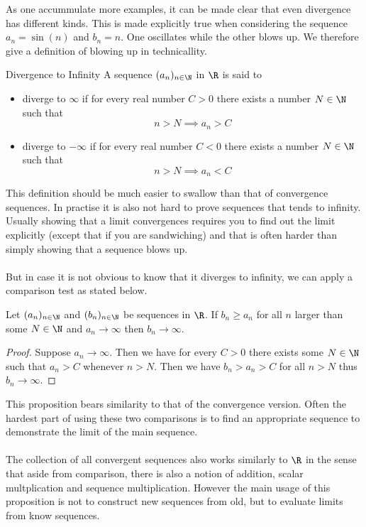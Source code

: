 As one accummulate more examples, it can be made clear that even divergence has different kinds. This is made explicitly true when considering the sequence $a_n=\sin(n)$ and $b_n=n$. One oscillates while the other blows up. We therefore give a definition of blowing up in technicallity. 

\begin{defn}{Divergence to Infinity}{} A sequence $(a_n)_{n\in\N}$ in $\R$ is said to 
\begin{itemize}
\item diverge to $\infty$ if for every real number $C>0$ there exists a number $N\in\N$ such that $$n>N\implies a_n>C$$
\item diverge to $-\infty$ if for every real number $C<0$ there exists a number $N\in\N$ such that $$n>N\implies a_n<C$$
\end{itemize}
\end{defn}

This definition should be much easier to swallow than that of convergence sequences. In practise it is also not hard to prove sequences that tends to infinity. Usually showing that a limit convergences requires you to find out the limit explicitly (except that if you are sandwiching) and that is often harder than simply showing that a sequence blows up. \\~\\
But in case it is not obvious to know that it diverges to infinity, we can apply a comparison test as stated below. 

\begin{prp}{}{} Let $(a_n)_{n\in\N}$ and $(b_n)_{n\in\N}$ be sequences in $\R$. If $b_n\geq a_n$ for all $n$ larger than some $N\in\N$ and $a_n\to\infty$ then $b_n\to\infty$. \tcbline
\begin{proof} Suppose $a_n\to\infty$. Then we have for every $C>0$ there exists some $N\in\N$ such that $a_n>C$ whenever $n>N$. Then we have $b_n>a_n>C$ for all $n>N$ thus $b_n\to\infty$. 
\end{proof}
\end{prp}

This proposition bears similarity to that of the convergence version. Often the hardest part of using these two comparisons is to find an appropriate sequence to demonstrate the limit of the main sequence. \\~\\

The collection of all convergent sequences also works similarly to $\R$ in the sense that aside from comparison, there is also a notion of addition, scalar multplication and sequence multiplication. However the main usage of this proposition is not to construct new sequences from old, but to evaluate limits from know sequences. 


